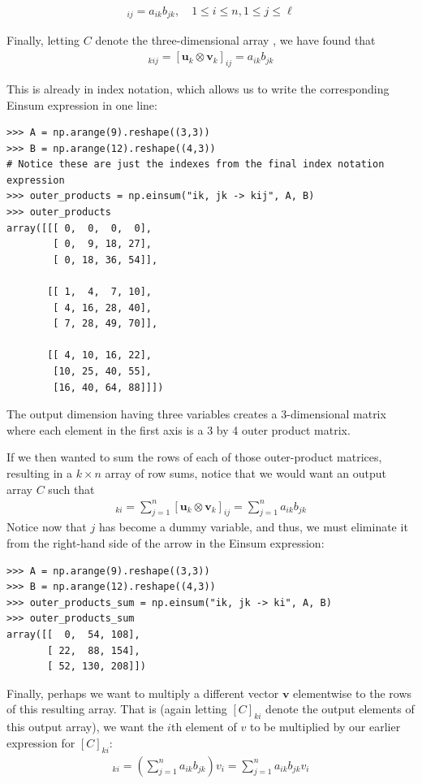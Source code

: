 \begin{align*}
	[\mathbf{u}_k \otimes \mathbf{v}_k]_{ij} = a_{ik} b_{jk}, \quad 1 \leq i \leq n, 1 \leq j \leq \ell
\end{align*}

Finally, letting $C$ denote the three-dimensional array , we have found that 
\begin{align*}
	[C]_{kij} = [\mathbf{u}_k \otimes \mathbf{v}_k]_{ij} =  a_{ik} b_{jk}
\end{align*}

This is already in index notation, which allows us to write the corresponding Einsum expression in one line:

\begin{lstlisting}
>>> A = np.arange(9).reshape((3,3))
>>> B = np.arange(12).reshape((4,3))
# Notice these are just the indexes from the final index notation expression
>>> outer_products = np.einsum("ik, jk -> kij", A, B)
>>> outer_products
array([[[ 0,  0,  0,  0],
        [ 0,  9, 18, 27],
        [ 0, 18, 36, 54]],

       [[ 1,  4,  7, 10],
        [ 4, 16, 28, 40],
        [ 7, 28, 49, 70]],

       [[ 4, 10, 16, 22],
        [10, 25, 40, 55],
        [16, 40, 64, 88]]])
\end{lstlisting} 

The output dimension having three variables creates a 3-dimensional matrix where each element in the first axis is a 3 by 4 outer product matrix. 

If we then wanted to sum the rows of each of those outer-product matrices, resulting in a $k \times n$ array of row sums, notice that we would want an output array $C$ such that 
\begin{align*}
	[C]_{ki} = \sum_{j=1}^{n} [\mathbf{u}_k \otimes \mathbf{v}_k]_{ij} =  \sum_{j=1}^{n} a_{ik} b_{jk}
\end{align*}
Notice now that $j$ has become a dummy variable, and thus, we must eliminate it from the right-hand side of the arrow in the Einsum expression:
\begin{lstlisting}
>>> A = np.arange(9).reshape((3,3))
>>> B = np.arange(12).reshape((4,3))
>>> outer_products_sum = np.einsum("ik, jk -> ki", A, B)
>>> outer_products_sum
array([[  0,  54, 108],
       [ 22,  88, 154],
       [ 52, 130, 208]])
\end{lstlisting}

Finally, perhaps we want to multiply a different vector $\mathbf{v}$ elementwise to the rows of this resulting  array. 
That is (again letting $[C]_{ki}$ denote the output elements of this output array), we want the $i$th element of $v$ to be multiplied by our earlier expression for $[C]_{ki}$:
\begin{align*}
[C]_{ki} = \left(\sum_{j=1}^{n} a_{ik} b_{jk} \right)v_i = \sum_{j=1}^{n} a_{ik} b_{jk} v_i
\end{align*} 

